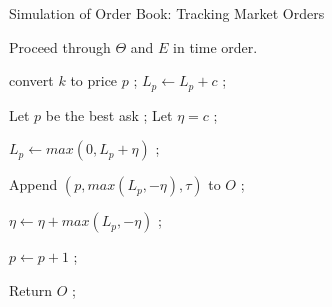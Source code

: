 \begin{algorithm}[H]
\SetAlgoLined
\caption{Simulation of Order Book: Tracking Market Orders}
Proceed through $\Theta$ and $E$ in time order. 

 {
     {
        convert $k$ to price $p$ ;
         {
            $L_p \leftarrow L_p + c$ ;
        }
    }
     {
        Let $p$ be the best ask ;
        Let $\eta = c$ ;
         {
            $L_p \leftarrow max(0,L_p + \eta)$ ;
            
            Append $(p,max(L_p, -\eta), \tau)$ to $O$ ;

            $\eta \leftarrow \eta + max(L_p, -\eta)$ ;
            
            $p \leftarrow p + 1$ ;
        }
    }
}

Return $O$ ;
\end{algorithm}







